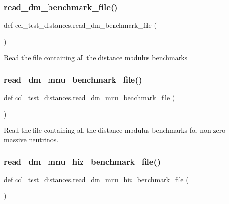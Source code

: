 \subsubsection{\texorpdfstring{read\+\_\+dm\+\_\+benchmark\+\_\+file()}{read\_dm\_benchmark\_file()}}
{\footnotesize\ttfamily def ccl\+\_\+test\+\_\+distances.\+read\+\_\+dm\+\_\+benchmark\+\_\+file (\begin{DoxyParamCaption}{ }\end{DoxyParamCaption})}

\begin{DoxyVerb}Read the file containing all the distance modulus benchmarks
\end{DoxyVerb}
 \mbox{\label{namespaceccl__test__distances_a4180f0f2e97de211286008b2a0a050dd}} 
\subsubsection{\texorpdfstring{read\+\_\+dm\+\_\+mnu\+\_\+benchmark\+\_\+file()}{read\_dm\_mnu\_benchmark\_file()}}
{\footnotesize\ttfamily def ccl\+\_\+test\+\_\+distances.\+read\+\_\+dm\+\_\+mnu\+\_\+benchmark\+\_\+file (\begin{DoxyParamCaption}{ }\end{DoxyParamCaption})}

\begin{DoxyVerb}Read the file containing all the distance modulus benchmarks
for non-zero massive neutrinos.
\end{DoxyVerb}
 \mbox{\label{namespaceccl__test__distances_aa10a822700be058619a7391bdbc433d5}} 
\subsubsection{\texorpdfstring{read\+\_\+dm\+\_\+mnu\+\_\+hiz\+\_\+benchmark\+\_\+file()}{read\_dm\_mnu\_hiz\_benchmark\_file()}}
{\footnotesize\ttfamily def ccl\+\_\+test\+\_\+distances.\+read\+\_\+dm\+\_\+mnu\+\_\+hiz\+\_\+benchmark\+\_\+file (\begin{DoxyParamCaption}{ }\end{DoxyParamCaption})}

